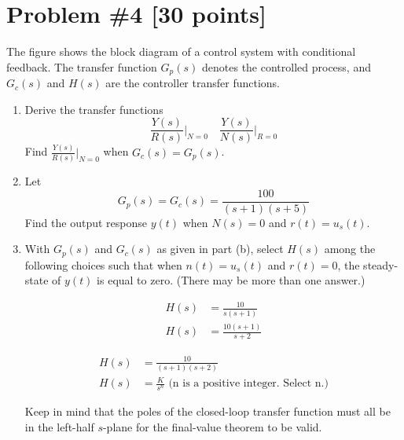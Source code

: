\documentclass{article}
\begin{document}
\newpage
\section*{Problem \#4 [30 points]}

The figure shows the block diagram of a control system with conditional feedback. The transfer function \( G_p(s) \) denotes the controlled process, and \( G_c(s) \) and \( H(s) \) are the controller transfer functions.

\begin{enumerate}
    \item[a. ] Derive the transfer functions 
    \[
    \frac{Y(s)}{R(s)} \bigg|_{N=0}  \quad \frac{Y(s)}{N(s)} \bigg|_{R=0}
    \]
    Find \( \frac{Y(s)}{R(s)} \bigg|_{N=0} \) when \( G_c(s) = G_p(s) \).
    
    \item[b. ] Let
    \[
    G_p(s) = G_c(s) = \frac{100}{(s+1)(s+5)}
    \]
    Find the output response \( y(t) \) when \( N(s) = 0 \) and \( r(t) = u_s(t) \).

    \item[c. ] With \( G_p(s) \) and \( G_c(s) \) as given in part (b), select \( H(s) \) among the following choices such that when \( n(t) = u_s(t) \) and \( r(t) = 0 \), the steady-state of \( y(t) \) is equal to zero. (There may be more than one answer.)
\begin{center}
  \begin{minipage}{0.4\textwidth}
    \begin{align*}
      H(s) &= \frac{10}{s(s+1)} \\
      H(s) &= \frac{10(s+1)}{s+2}
    \end{align*}
  \end{minipage}
  \begin{minipage}{0.4\textwidth}
    \begin{align*}
      H(s) &= \frac{10}{(s+1)(s+2)} \\
      H(s) &= \frac{K}{s^n} \text{ (n is a positive integer. Select n.)}
    \end{align*}
  \end{minipage}
\end{center}

    
    
    Keep in mind that the poles of the closed-loop transfer function must all be in the left-half \( s \)-plane for the final-value theorem to be valid.
\end{enumerate}
\newline
\begin{figure}[htbp]
  \centering
  
\end{figure}
\end{document}
